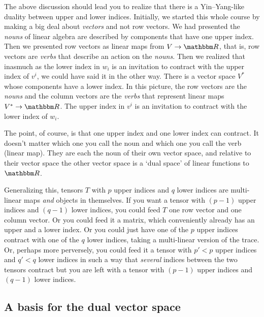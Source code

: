 \documentclass[12pt]{article}
\begin{document}
The above discussion should lead you to realize that there is a Yin--Yang-like duality between upper and lower indices. Initially, we started this whole course by making a big deal about \emph{vectors} and not row vectors. We had presented the \emph{nouns} of linear algebra are described by components that have one upper index. Then we presented row vectors as linear maps from $V\to \RR$, that is, row vectors are \emph{verbs} that describe an action on the \emph{nouns}. Then we realized that inasmuch as the lower index in $w_i$ is an invitation to contract with the upper index of $v^i$, we could have said it in the other way. There is a vector space $V^*$ whose components have a lower index. In this picture, the row vectors are the \emph{nouns} and the column vectors are the \emph{verbs} that represent linear maps $V^*\to \RR$. The upper index in $v^i$ is an invitation to contract with the lower index of $w_i$.

The point, of course, is that one upper index and one lower index can contract. It doesn't matter which one you call the noun and which one you call the verb (linear map). They are each the noun of their own vector space, and relative to their vector space the other vector space is a `dual space' of linear functions to $\RR$.

Generalizing this, tensors $T$ with $p$ upper indices and $q$ lower indices are multi-linear maps \emph{and} objects in themselves. If you want a tensor with $(p-1)$ upper indices and $(q-1)$ lower indices,  you could feed $T$ one row vector and one column vector. Or you could feed it a matrix, which conveniently already has an upper and a lower index. Or you could just have one of the $p$ upper indices contract with one of the $q$ lower indices, taking a multi-linear version of the trace. Or, perhaps more perversely, you could feed it a tensor with $p' < p$ upper indices and $q' < q$ lower indices in such a way that \emph{several} indices between the two tensors contract but you are left with a tensor with $(p-1)$ upper indices and $(q-1)$ lower indices. 

\subsection{A basis for the dual vector space}
\end{document}
